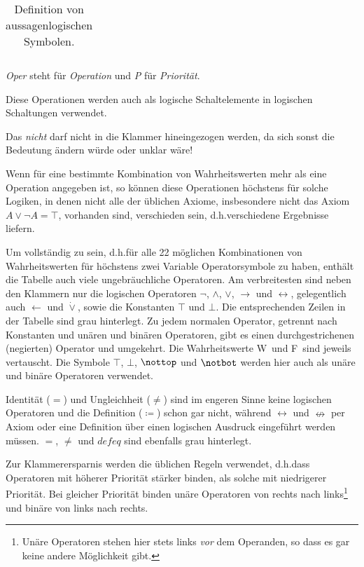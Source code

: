 \documentclass[english,ngerman,parskip=half,headsepline,footsepline]{scrreprt}
\makeatletter
\newcommand{\WWtrue}{W}
\newcommand{\WWfalse}{F}
\newcommand{\ltrue}{\top}      %
\newcommand{\lnfalse}{\notbot} %
\newcommand{\lfalse}{\bot}     %
\newcommand{\lntrue}{\nottop}  %
\newcommand{\lleftimp}{\operatorname{\leftarrow}}      %
\newcommand{\limp}{\operatorname{\rightarrow}}         %
\newcommand{\lequiv}{\operatorname{\leftrightarrow}}   %
\newcommand{\lnequiv}{\operatorname{\nleftrightarrow}} %
\newcommand{\lxor}{\operatorname{\dot{\lor}}}          %
\newcommand{\defeq}{\coloneqq}
\newcommand{\textdh}{d.\@ h.\@}
\makeatother
\begin{document}
\begin{table}
\begin{threeparttable}
\begin{tabularx}{\linewidth}{c||c:cc:cccc|X:X|c|}
		\end{tabularx}
		\caption{Definition von aussagenlogischen Symbolen.}
		\label{tab:aussagenlogische Symbole}
		\begin{tablenotes}
			\item[1] \emph{Oper} steht für \emph{Operation} und \emph{P} für \emph{Priorität}.
			\item[2] Diese Operationen werden auch als logische Schaltelemente in logischen Schaltungen verwendet.
			\item[3] Das \emph{nicht} darf nicht in die Klammer hineingezogen werden, da sich sonst die Bedeutung ändern würde oder unklar wäre!
		\end{tablenotes}
	\end{threeparttable}\end{table}

	Wenn für eine bestimmte Kombination von Wahrheitswerten mehr als eine Operation angegeben ist, so können diese Operationen höchstens für solche Logiken, in denen nicht alle der üblichen Axiome, insbesondere nicht das Axiom $A\lor\lnot A=\ltrue$, vorhanden sind, verschieden sein, \textdh verschiedene Ergebnisse liefern.

	Um vollständig zu sein, \textdh für alle 22 möglichen Kombinationen von Wahrheitswerten für höchstens zwei Variable Operatorsymbole zu haben, enthält die Tabelle auch viele ungebräuchliche Operatoren. Am verbreitesten sind neben den Klammern nur die logischen Operatoren $\lnot$, $\land$, $\lor$, $\limp$ und $\lequiv$, gelegentlich auch $\lleftimp$ und $\lxor$, sowie die Konstanten $\ltrue$ und $\lfalse$. Die entsprechenden Zeilen in der Tabelle sind grau hinterlegt. Zu jedem normalen Operator, getrennt nach Konstanten und unären und binären Operatoren, gibt es einen durchgestrichenen (negierten) Operator und umgekehrt. Die Wahrheitswerte \WWtrue\ und \WWfalse\ sind jeweils vertauscht. Die Symbole $\ltrue$, $\lfalse$, $\lntrue$ und $\lnfalse$ werden hier auch als unäre und binäre Operatoren verwendet.

	Identität ($=$) und Ungleichheit  ($\ne$) sind im engeren Sinne keine logischen Operatoren und die Definition ($\defeq$) schon gar nicht, während $\lequiv$ und $\lnequiv$ per Axiom oder eine Definition über einen logischen Ausdruck eingeführt werden müssen. $=$, $\ne$ und $defeq$ sind ebenfalls grau hinterlegt.

	Zur Klammerersparnis werden die üblichen Regeln verwendet, \textdh dass Operatoren mit höherer Priorität stärker binden, als solche mit niedrigerer Priorität. Bei gleicher Priorität binden unäre Operatoren von rechts nach links\footnote{ Unäre Operatoren stehen hier stets links \emph{vor} dem Operanden, so dass es gar keine andere Möglichkeit gibt.} und binäre von links nach rechts.
\end{document}
